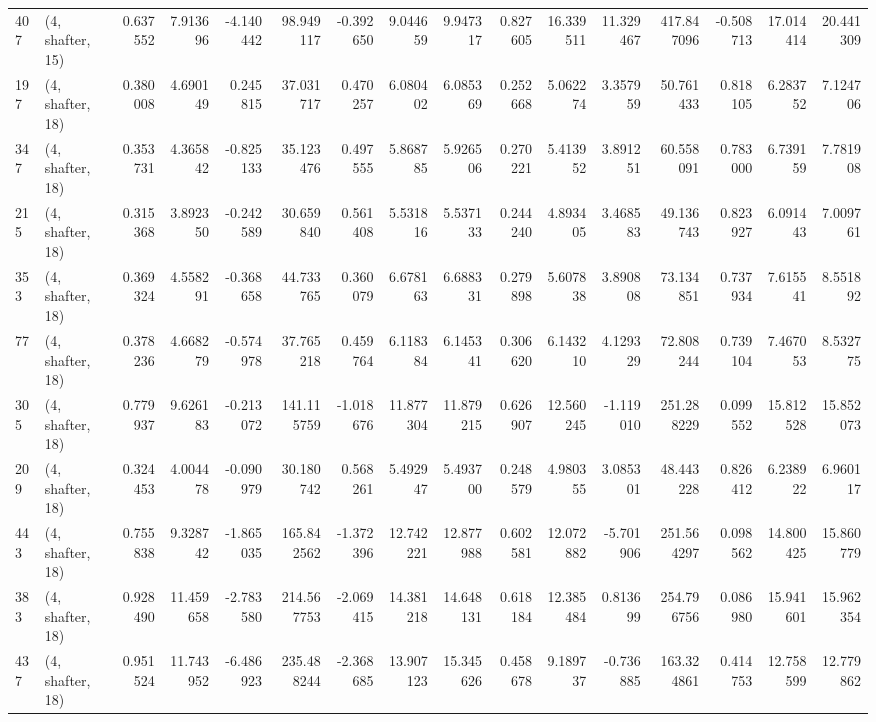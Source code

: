 \begin{tabular}{llrrrrrrrrrrrrrr}
407 &  (4, shafter, 15) &   0.637552 &   7.913696 &  -4.140442 &    98.949117 &  -0.392650 &   9.044659 &   9.947317 &  0.827605 &  16.339511 &  11.329467 &    417.847096 &   -0.508713 &   17.014414 &   20.441309 \\
197 &  (4, shafter, 18) &   0.380008 &   4.690149 &   0.245815 &    37.031717 &   0.470257 &   6.080402 &   6.085369 &  0.252668 &   5.062274 &   3.357959 &     50.761433 &    0.818105 &    6.283752 &    7.124706 \\
347 &  (4, shafter, 18) &   0.353731 &   4.365842 &  -0.825133 &    35.123476 &   0.497555 &   5.868785 &   5.926506 &  0.270221 &   5.413952 &   3.891251 &     60.558091 &    0.783000 &    6.739159 &    7.781908 \\
215 &  (4, shafter, 18) &   0.315368 &   3.892350 &  -0.242589 &    30.659840 &   0.561408 &   5.531816 &   5.537133 &  0.244240 &   4.893405 &   3.468583 &     49.136743 &    0.823927 &    6.091443 &    7.009761 \\
353 &  (4, shafter, 18) &   0.369324 &   4.558291 &  -0.368658 &    44.733765 &   0.360079 &   6.678163 &   6.688331 &  0.279898 &   5.607838 &   3.890808 &     73.134851 &    0.737934 &    7.615541 &    8.551892 \\
77  &  (4, shafter, 18) &   0.378236 &   4.668279 &  -0.574978 &    37.765218 &   0.459764 &   6.118384 &   6.145341 &  0.306620 &   6.143210 &   4.129329 &     72.808244 &    0.739104 &    7.467053 &    8.532775 \\
305 &  (4, shafter, 18) &   0.779937 &   9.626183 &  -0.213072 &   141.115759 &  -1.018676 &  11.877304 &  11.879215 &  0.626907 &  12.560245 &  -1.119010 &    251.288229 &    0.099552 &   15.812528 &   15.852073 \\
209 &  (4, shafter, 18) &   0.324453 &   4.004478 &  -0.090979 &    30.180742 &   0.568261 &   5.492947 &   5.493700 &  0.248579 &   4.980355 &   3.085301 &     48.443228 &    0.826412 &    6.238922 &    6.960117 \\
443 &  (4, shafter, 18) &   0.755838 &   9.328742 &  -1.865035 &   165.842562 &  -1.372396 &  12.742221 &  12.877988 &  0.602581 &  12.072882 &  -5.701906 &    251.564297 &    0.098562 &   14.800425 &   15.860779 \\
383 &  (4, shafter, 18) &   0.928490 &  11.459658 &  -2.783580 &   214.567753 &  -2.069415 &  14.381218 &  14.648131 &  0.618184 &  12.385484 &   0.813699 &    254.796756 &    0.086980 &   15.941601 &   15.962354 \\
437 &  (4, shafter, 18) &   0.951524 &  11.743952 &  -6.486923 &   235.488244 &  -2.368685 &  13.907123 &  15.345626 &  0.458678 &   9.189737 &  -0.736885 &    163.324861 &    0.414753 &   12.758599 &   12.779862 \\

\end{tabular}
